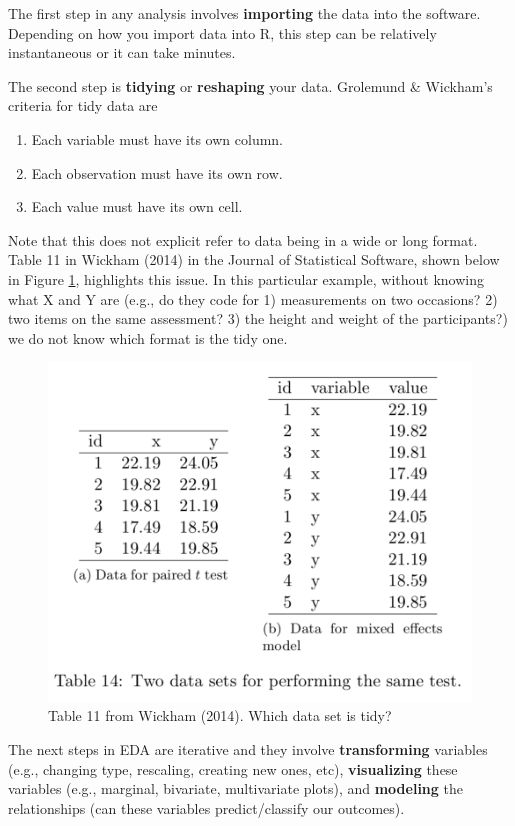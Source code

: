 \documentclass[]{book}
\providecommand{\tightlist}{%
  \setlength{\itemsep}{0pt}\setlength{\parskip}{0pt}}
\begin{document}
The first step in any analysis involves \textbf{importing} the data into the software. Depending on how you import data into R, this step can be relatively instantaneous or it can take minutes.

The second step is \textbf{tidying} or \textbf{reshaping} your data. Grolemund \& Wickham's criteria for tidy data are

\begin{enumerate}
\def\labelenumi{\arabic{enumi}.}
\tightlist
\item
  Each variable must have its own column.
\item
  Each observation must have its own row.
\item
  Each value must have its own cell.
\end{enumerate}

Note that this does not explicit refer to data being in a wide or long format. Table 11 in Wickham (2014) in the Journal of Statistical Software, shown below in Figure \ref{fig:tidypic}, highlights this issue. In this particular example, without knowing what X and Y are (e.g., do they code for 1) measurements on two occasions? 2) two items on the same assessment? 3) the height and weight of the participants?) we do not know which format is the tidy one.

\begin{figure}
\includegraphics[width=0.6\linewidth]{images/whichtidy} \caption{Table 11 from Wickham (2014). Which data set is tidy?}\label{fig:tidypic}
\end{figure}

The next steps in EDA are iterative and they involve \textbf{transforming} variables (e.g., changing type, rescaling, creating new ones, etc), \textbf{visualizing} these variables (e.g., marginal, bivariate, multivariate plots), and \textbf{modeling} the relationships (can these variables predict/classify our outcomes).
\end{document}
